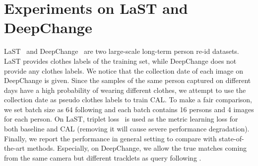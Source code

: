 \documentclass[10pt,twocolumn,letterpaper]{article}
\begin{document}
\begin{table}[t]
	\centering
	\caption{Comparison with state-of-the-art methods on LaST and DeepChange.}
	\vspace{-20pt}
	\small
	\begin{center}
	\end{center}
	\vspace{-20pt}
	\label{tab:sota_last_deepchange}
\end{table}

\section{Experiments on LaST and DeepChange}


LaST~\cite{LaST} and DeepChange~\cite{DeepChange} are two large-scale long-term person re-id datasets.
LaST provides clothes labels of the training set, while DeepChange does not provide any clothes labels.
We notice that the collection date of each image on DeepChange is given.
Since the samples of the same person captured on different days have a high probability of wearing different clothes, we attempt to use the collection date as pseudo clothes labels to train CAL.
To make a fair comparison, we set batch size as 64 following \cite{LaST} and each batch contains 16 persons and 4 images for each person. 
On LaST, triplet loss~\cite{Hermans2017In} is used as the metric learning loss for both baseline and CAL (removing it will cause severe performance degradation).
Finally, we report the performance in general setting to compare with state-of-the-art methods.
Especially, on DeepChange, we allow the true matches coming from the same camera but different tracklets as query following \cite{DeepChange}.
\end{document}
